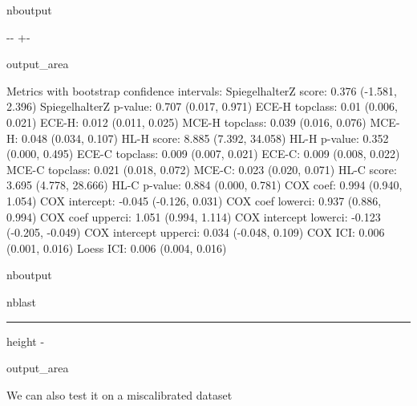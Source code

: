 \documentclass[letterpaper,10pt,english]{sphinxmanual}
\let\sphinxpxdimen\pdfpxdimen\else\newdimen\sphinxpxdimen
\begin{document}
\begin{sphinxuseclass}{nboutput}
{

\kern-\sphinxverbatimsmallskipamount\kern-\baselineskip
\kern+\FrameHeightAdjust\kern-\fboxrule
\vspace{\nbsphinxcodecellspacing}

\begin{sphinxuseclass}{output_area}
\begin{sphinxuseclass}{}


\begin{sphinxVerbatim}[commandchars=\\\{\}]
Metrics with bootstrap confidence intervals:
SpiegelhalterZ score: 0.376 (-1.581, 2.396)
SpiegelhalterZ p-value: 0.707 (0.017, 0.971)
ECE-H topclass: 0.01 (0.006, 0.021)
ECE-H: 0.012 (0.011, 0.025)
MCE-H topclass: 0.039 (0.016, 0.076)
MCE-H: 0.048 (0.034, 0.107)
HL-H score: 8.885 (7.392, 34.058)
HL-H p-value: 0.352 (0.000, 0.495)
ECE-C topclass: 0.009 (0.007, 0.021)
ECE-C: 0.009 (0.008, 0.022)
MCE-C topclass: 0.021 (0.018, 0.072)
MCE-C: 0.023 (0.020, 0.071)
HL-C score: 3.695 (4.778, 28.666)
HL-C p-value: 0.884 (0.000, 0.781)
COX coef: 0.994 (0.940, 1.054)
COX intercept: -0.045 (-0.126, 0.031)
COX coef lowerci: 0.937 (0.886, 0.994)
COX coef upperci: 1.051 (0.994, 1.114)
COX intercept lowerci: -0.123 (-0.205, -0.049)
COX intercept upperci: 0.034 (-0.048, 0.109)
COX ICI: 0.006 (0.001, 0.016)
Loess ICI: 0.006 (0.004, 0.016)
\end{sphinxVerbatim}



\end{sphinxuseclass}
\end{sphinxuseclass}
}

\end{sphinxuseclass}
\begin{sphinxuseclass}{nboutput}
\begin{sphinxuseclass}{nblast}
\hrule height -\fboxrule\relax
\vspace{\nbsphinxcodecellspacing}

\makeatletter\setbox\nbsphinxpromptbox\box\voidb@x\makeatother

\begin{nbsphinxfancyoutput}

\begin{sphinxuseclass}{output_area}
\begin{sphinxuseclass}{}
\noindent\sphinxincludegraphics[width=702\sphinxpxdimen,height=530\sphinxpxdimen]{{notebooks_quickstart_16_1}.png}

\end{sphinxuseclass}
\end{sphinxuseclass}
\end{nbsphinxfancyoutput}

\end{sphinxuseclass}
\end{sphinxuseclass}
\sphinxAtStartPar
We can also test it on a miscalibrated dataset
\end{document}

